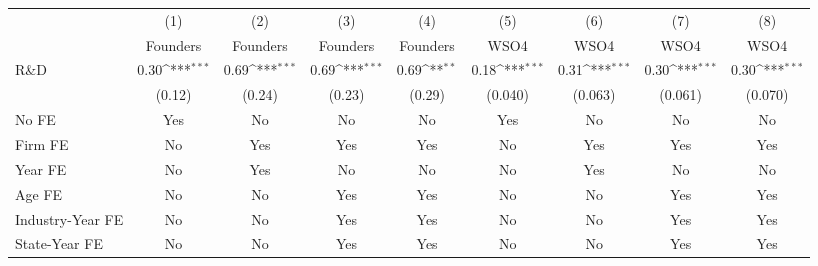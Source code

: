 {
\def\sym#1{\ifmmode^{#1}\else\(^{#1}\)\fi}
\begin{tabular}{l*{8}{c}}
\toprule
                    &\multicolumn{1}{c}{(1)}&\multicolumn{1}{c}{(2)}&\multicolumn{1}{c}{(3)}&\multicolumn{1}{c}{(4)}&\multicolumn{1}{c}{(5)}&\multicolumn{1}{c}{(6)}&\multicolumn{1}{c}{(7)}&\multicolumn{1}{c}{(8)}\\
                    &\multicolumn{1}{c}{Founders}&\multicolumn{1}{c}{Founders}&\multicolumn{1}{c}{Founders}&\multicolumn{1}{c}{Founders}&\multicolumn{1}{c}{WSO4}&\multicolumn{1}{c}{WSO4}&\multicolumn{1}{c}{WSO4}&\multicolumn{1}{c}{WSO4}\\
\midrule
R\&D                &        0.30\sym{***}&        0.69\sym{***}&        0.69\sym{***}&        0.69\sym{**} &        0.18\sym{***}&        0.31\sym{***}&        0.30\sym{***}&        0.30\sym{***}\\
                    &      (0.12)         &      (0.24)         &      (0.23)         &      (0.29)         &     (0.040)         &     (0.063)         &     (0.061)         &     (0.070)         \\
\addlinespace
No FE               &         Yes         &          No         &          No         &          No         &         Yes         &          No         &          No         &          No         \\
\addlinespace
Firm FE             &          No         &         Yes         &         Yes         &         Yes         &          No         &         Yes         &         Yes         &         Yes         \\
\addlinespace
Year FE             &          No         &         Yes         &          No         &          No         &          No         &         Yes         &          No         &          No         \\
\addlinespace
Age FE              &          No         &          No         &         Yes         &         Yes         &          No         &          No         &         Yes         &         Yes         \\
\addlinespace
Industry-Year FE    &          No         &          No         &         Yes         &         Yes         &          No         &          No         &         Yes         &         Yes         \\
\addlinespace
State-Year FE       &          No         &          No         &         Yes         &         Yes         &          No         &          No         &         Yes         &         Yes         \\

\end{tabular}}
